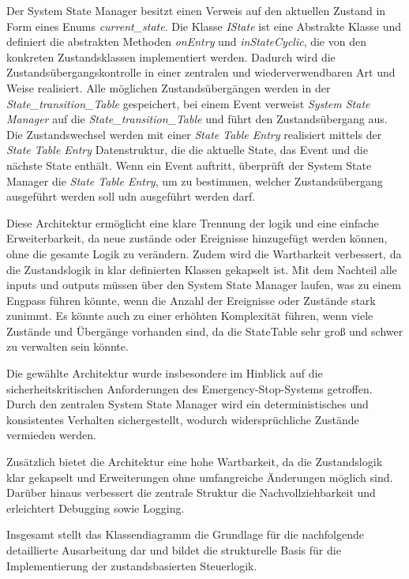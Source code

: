 Der System State Manager besitzt einen Verweis auf den aktuellen Zustand in Form eines Enums \emph{current\_state}. 
Die Klasse \emph{IState} ist eine Abstrakte Klasse und definiert die abstrakten Methoden \emph{onEntry} und \emph{inStateCyclic}, 
die von den konkreten Zustandsklassen implementiert werden. 
Dadurch wird die Zustandsübergangskontrolle in einer zentralen und wiederverwendbaren Art und Weise realisiert.
Alle möglichen 
Zustandsübergängen werden in der \emph{State\_transition\_Table} gespeichert, bei einem Event verweist \emph{System State Manager}
auf die \emph{State\_transition\_Table} und führt den Zustandsübergang aus. 
Die Zustandswechsel werden mit einer \emph{State Table Entry} realisiert mittels der \emph{State Table Entry} Datenstruktur,
die die aktuelle State, das Event und die nächste State enthält. Wenn ein Event auftritt, überprüft der System State Manager
die \emph{State Table Entry}, um zu bestimmen, welcher Zustandsübergang ausgeführt werden soll udn ausgeführt werden darf. 

Diese Architektur ermöglicht eine klare Trennung der logik und eine einfache Erweiterbarkeit, da 
neue zustände oder Ereignisse hinzugefügt werden können, ohne die gesamte Logik zu verändern. Zudem wird die 
Wartbarkeit verbessert, da die Zustandslogik in klar definierten Klassen gekapselt ist.
Mit dem Nachteil alle inputs und outputs müssen über den System State Manager laufen, was zu einem Engpass 
führen könnte, wenn die Anzahl der Ereignisse oder Zustände stark zunimmt. Es könnte auch zu einer erhöhten 
Komplexität führen, wenn viele Zustände und Übergänge vorhanden sind, da die StateTable sehr groß und schwer zu verwalten sein könnte.


Die gewählte Architektur wurde insbesondere im Hinblick auf die sicherheitskritischen Anforderungen des Emergency-Stop-Systems 
getroffen. Durch den zentralen System State Manager wird ein deterministisches und konsistentes Verhalten sichergestellt, 
wodurch widersprüchliche Zustände vermieden werden. 

Zusätzlich bietet die Architektur eine hohe Wartbarkeit, da die Zustandslogik klar gekapselt und Erweiterungen 
ohne umfangreiche Änderungen möglich sind. Darüber hinaus verbessert die zentrale Struktur die Nachvollziehbarkeit 
und erleichtert Debugging sowie Logging.

Insgesamt stellt das Klassendiagramm die Grundlage für die nachfolgende detaillierte Ausarbeitung dar und 
bildet die strukturelle Basis für die Implementierung der zustandsbasierten Steuerlogik.

